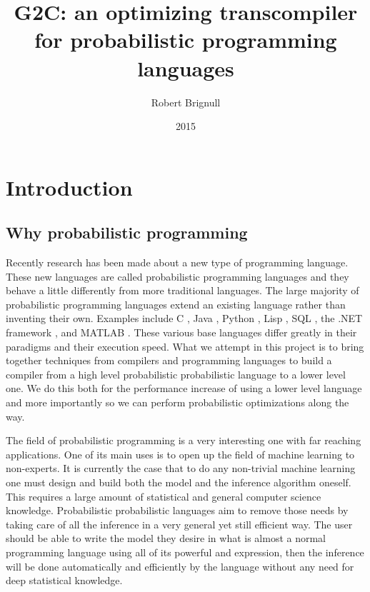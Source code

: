 \documentclass[a4paper]{article}
\title{G2C: an optimizing transcompiler for probabilistic programming languages}
\author{Robert Brignull}
\date{2015}
\begin{document}
\maketitle


\section{Introduction}




\subsection{Why probabilistic programming}

Recently research has been made about a new type of programming language. These new languages are called probabilistic programming languages and they behave a little differently from more traditional languages. The large majority of probabilistic programming languages extend an existing language rather than inventing their own. Examples include C \cite{ProbabilisticC}, Java \cite{BLOG}, Python \cite{PyMC}, Lisp \cite{Anglican, Venture, Church}, SQL \cite{PSQL}, the .NET framework \cite{Infer.NET}, and MATLAB \cite{dimple}. These various base languages differ greatly in their paradigms and their execution speed. What we attempt in this project is to bring together techniques from compilers and programming languages to build a compiler from a high level probabilistic probabilistic language to a lower level one. We do this both for the performance increase of using a lower level language and more importantly so we can perform probabilistic optimizations along the way.

The field of probabilistic programming is a very interesting one with far reaching applications. One of its main uses is to open up the field of machine learning to non-experts. It is currently the case that to do any non-trivial machine learning one must design and build both the model and the inference algorithm oneself. This requires a large amount of statistical and general computer science knowledge. Probabilistic probabilistic languages aim to remove those needs by taking care of all the inference in a very general yet still efficient way. The user should be able to write the model they desire in what is almost a normal programming language using all of its powerful and expression, then the inference will be done automatically and efficiently by the language without any need for deep statistical knowledge.
\end{document}
